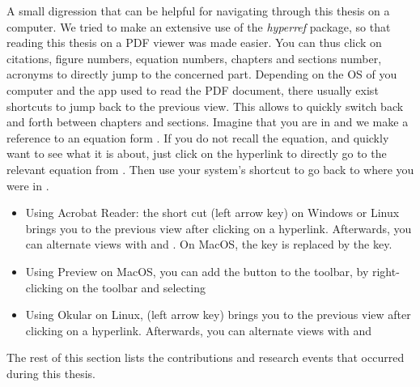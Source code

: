 \begin{remark}
    A small digression that can be helpful for navigating through this thesis on a computer. We tried to make an extensive use of the \textit{hyperref} package, so that reading this thesis on a PDF viewer was made easier. You can thus click on citations, figure numbers, equation numbers, chapters and sections number, acronyms \etc to directly jump to the concerned part. Depending on the OS of you computer and the app used to read the PDF document, there usually exist shortcuts to jump back to the previous view. This allows to quickly switch back and forth between chapters and sections. Imagine that you are in  and we make a reference to an equation form . If you do not recall the equation, and quickly want to see what it is about, just click on the hyperlink to directly go to the relevant equation from . Then use your system's shortcut to go back to where you were in . 
    \begin{itemize}
        \item Using Acrobat Reader: the short cut \keys{\Altwin + \arrowkeyleft} (left arrow key) on Windows or Linux brings you to the previous view after clicking on a hyperlink. Afterwards, you can alternate views with \keys{\Altwin + \arrowkeyright} and \keys{\Altwin + \arrowkeyleft}. On MacOS, the \keys{\Altwin} key is replaced by the \keys{\cmd} key.
        \item Using Preview on MacOS, you can add the  button to the toolbar, by right-clicking on the toolbar and selecting 
        \item Using Okular on Linux, \keys{\Altwin + \shift + \arrowkeyleft} (left arrow key) brings you to the previous view after clicking on a hyperlink. Afterwards, you can alternate views with \keys{\Altwin + \shift + \arrowkeyright} and \keys{\Altwin + \shift + \arrowkeyleft}
    \end{itemize}
\end{remark}

The rest of this section lists the contributions and research events that occurred during this thesis.


